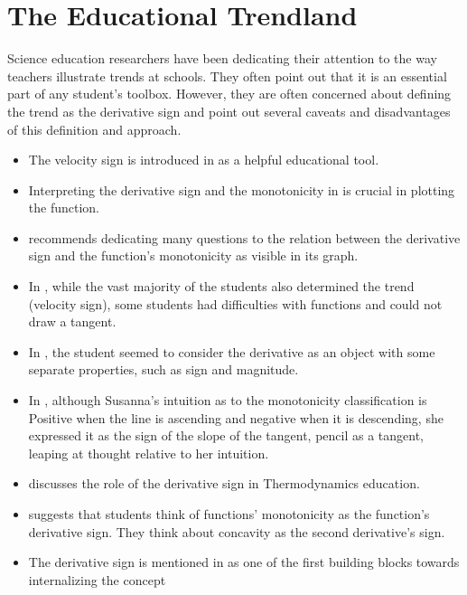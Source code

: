 \documentclass[11pt]{book}
\begin{document}
\chapter{The Educational Trendland}
\label{educational_trendland}
Science education researchers have been dedicating their attention to the way teachers illustrate trends at schools. They often point out that it is an essential part of any student's toolbox. However, they are often concerned about defining the trend as the derivative sign and point out several caveats and disadvantages of this definition and approach.
\begin{itemize}
\item The velocity sign is introduced in \cite{nemirovsky1994ways}
as a helpful educational tool.
\item Interpreting the derivative sign and the monotonicity in \cite{asiala1997development}
is crucial in plotting the function.
\item \cite{da2002analyzing}
recommends dedicating many questions to the relation between the derivative
sign and the function's monotonicity as visible in its graph.
\item In \cite{hahkioniemi2004perceptual},
while the vast majority of the students also determined the trend
(velocity sign), some students had difficulties with functions and
could not draw a tangent.
\item In \cite{hahkioniemi2007derivative},
the student seemed to consider the derivative as an object with some
separate properties, such as sign and magnitude.
\item In \cite{hahkioniemi2008durability},
although Susanna's intuition as to the monotonicity classification
is \textquotedbl Positive when the line is ascending and negative
when it is descending,\textquotedbl{} she expressed it as the \textquotedbl sign
of the slope of the tangent, pencil as a tangent,\textquotedbl{} leaping
at thought relative to her intuition.
\item \cite{christensen2010investigating}
discusses the role of the derivative sign in Thermodynamics education.
\item \cite{garcia2011characterizing}
suggests that students think of functions' monotonicity as the function's
derivative sign. They think about concavity as the second derivative's
sign.
\item The derivative sign is mentioned in \cite{eun2011calculus}
as one of the first building blocks towards internalizing the concept

\end{itemize}
\end{document}
